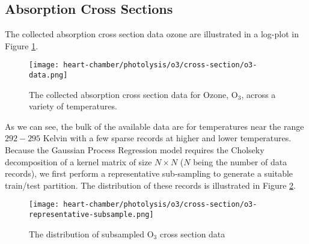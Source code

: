 \subsection{Absorption Cross Sections}

The collected absorption cross section data ozone are illustrated in a log-plot in Figure \ref{fig:cs-o3-data}.
\begin{figure}[!hbt]
  \centering
  \texttt{[image: heart-chamber/photolysis/o3/cross-section/o3-data.png]}
  \caption{The collected absorption cross section data for Ozone, $\mathrm{O_3}$, across a variety of temperatures.}
  \label{fig:cs-o3-data}
\end{figure}
As we can see, the bulk of the available data are for temperatures near the range $292-295$ Kelvin with a few sparse records at higher and lower temperatures. Because the Gaussian Process Regression model requires the Cholseky decomposition of a kernel matrix of size $N\times N$ ($N$ being the number of data records), we first perform a representative sub-sampling to generate a suitable train/test partition. The distribution of these records is illustrated in Figure \ref{fig:cs-o3-repr}.
\begin{figure}[!hbt]
  \centering
  \texttt{[image: heart-chamber/photolysis/o3/cross-section/o3-representative-subsample.png]}
  \caption{The distribution of subsampled $\mathrm{O}_3$ cross section data}
  \label{fig:cs-o3-repr}
\end{figure}

